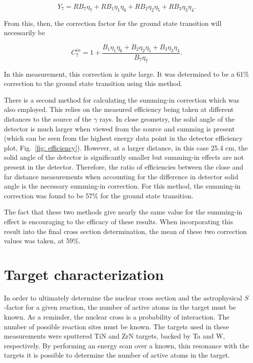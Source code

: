 \begin{equation}
Y_{7} = R B_{7} \eta_{7} + R B_{1} \eta_{1} \eta_{6} +  R B_{2} \eta_{2} \eta_{5} + R B_{3} \eta_{3} \eta_{4} .
\end{equation}

\noindent From this, then, the correction factor for the ground state transition will necessarily be

\begin{equation}
C_{7}^{in} = 1 + \dfrac{B_{1} \eta_{1} \eta_{6} + B_{2} \eta_{2} \eta_{5} + B_{3} \eta_{3} \eta_{4} }{B_{7} \eta_{7}}.
\end{equation}

\noindent In this measurement, this correction is quite large. It was determined to be a 61\% correction to the ground state transition using this method. 

There is a second method for calculating the summing-in correction which was also employed. This relies on the measured efficiency being taken at different distances to the source of the $\gamma$ rays. In close geometry, the solid angle of the detector is much larger when viewed from the source and summing is present (which can be seen from the highest energy data point in the detector efficiency plot, Fig.\ \ref{fig: efficiency}). However, at a larger distance, in this case 25.4 cm, the solid angle of the detector is significantly smaller but summing-in effects are not present in the detector. Therefore, the ratio of efficiencies between the close and far distance measurements when accounting for the difference in detector solid angle is the necessary summing-in correction. For this method, the summing-in correction was found to be 57\% for the ground state transition. 

The fact that these two methods give nearly the same value for the summing-in effect is encouraging to the efficacy of these results. When incorporating this result into the final cross section determination, the mean of these two correction values was taken, at 59\%. 






\section{Target characterization}
\label{sec: targetCharacterization}

In order to ultimately determine the nuclear cross section and the astrophysical $S$-factor for a given reaction, the number of active atoms in the target must be known. As a reminder, the nuclear cross is a probability of interaction. The number of possible reaction sites must be known. The targets used in these measurements were sputtered TiN and ZrN targets, backed by Ta and W, respectively. By performing an energy scan over a known, thin resonance with the targets it is possible to determine the number of active atoms in the target. 


